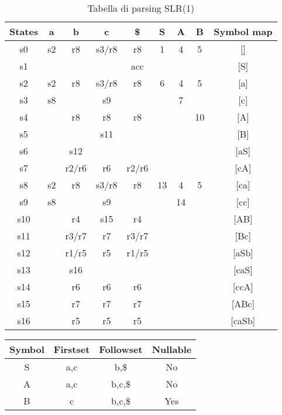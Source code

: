 {%
\begin{table}[H]
	\centering
	\begin{tabular}{ccccccccc}
		\toprule
		States & a  & b     & c     & \$    & S  & A  & B  & Symbol map \\
		\midrule
		s0     & s2 & r8    & s3/r8 & r8    & 1  & 4  & 5  & []         \\
		s1     &    &       &       & acc   &    &    &    & [S]        \\
		s2     & s2 & r8    & s3/r8 & r8    & 6  & 4  & 5  & [a]        \\
		s3     & s8 &       & s9    &       &    & 7  &    & [c]        \\
		s4     &    & r8    & r8    & r8    &    &    & 10 & [A]        \\
		s5     &    &       & s11   &       &    &    &    & [B]        \\
		s6     &    & s12   &       &       &    &    &    & [aS]       \\
		s7     &    & r2/r6 & r6    & r2/r6 &    &    &    & [cA]       \\
		s8     & s2 & r8    & s3/r8 & r8    & 13 & 4  & 5  & [ca]       \\
		s9     & s8 &       & s9    &       &    & 14 &    & [cc]       \\
		s10    &    & r4    & s15   & r4    &    &    &    & [AB]       \\
		s11    &    & r3/r7 & r7    & r3/r7 &    &    &    & [Bc]       \\
		s12    &    & r1/r5 & r5    & r1/r5 &    &    &    & [aSb]      \\
		s13    &    & s16   &       &       &    &    &    & [caS]      \\
		s14    &    & r6    & r6    & r6    &    &    &    & [ccA]      \\
		s15    &    & r7    & r7    & r7    &    &    &    & [ABc]      \\
		s16    &    & r5    & r5    & r5    &    &    &    & [caSb]     \\
		\bottomrule
	\end{tabular}
	\caption{Tabella di parsing SLR(1)}\end{table}


\begin{table}[H]\centering
	\begin{tabular}{cccc}
		\toprule
		Symbol & First\-set & Follow\-set & Nullable \\
		\midrule
		S      & a,c        & b,\$        & No       \\
		A      & a,c        & b,c,\$      & No       \\
		B      & c          & b,c,\$      & Yes      \\
		\bottomrule
	\end{tabular}
\end{table}
}
